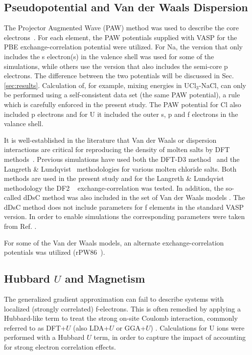 \documentclass[preprint,3p,10pt,twocolumn,number,sort&compress]{elsarticle}
\begin{document}
\subsection{Pseudopotential and Van der Waals Dispersion}

The Projector Augmented Wave (PAW) method was used to describe the core electrons~\cite{}. For each element, the PAW potentials supplied with VASP for the PBE exchange-correlation potential were utilized. For Na, the version that only includes the s electron(s) in the valence shell was used for some of the simulations, while others use the version that also includes the semi-core p electrons. The difference between the two potentials will be discussed in Sec. \ref{sec:results}. Calculation of, for example, mixing energies in UCl$_3$-NaCl, can only be performed using a self-consistent data set (the same PAW potential), a rule which is carefully enforced in the present study. The PAW potential for Cl also included p electrons and for U it included the outer s, p and f electrons in the valance shell. 

It is well-established in the literature that Van der Waals or dispersion interactions are critical for reproducing the density of molten salts by DFT methods~\cite{}. Previous simulations have used both the DFT-D3 method~\cite{} and the Langreth \& Lundqvist~\cite{dion2004} methodologies for various molten chloride salts. Both methods are used in the present study and for the Langreth \& Lundqvist methodology the DF2 ~\cite{klime2009} exchange-correlation was tested. In addition, the so-called dDsC method was also included in the set of Van der Waals models \cite{}. The dDsC method does not include parameters for f elements in the standard VASP version. In order to enable simulations the corresponding parameters were taken from Ref. \cite{}. 



For some of the Van der Waals models, an alternate exchange-correlation potentials was utilized (rPW86~\cite{}). 

\subsection{Hubbard $U$ and Magnetism}

The generalized gradient approximation can fail to describe systems with localized (strongly correlated) f-electrons. This is often remedied by applying a Hubbard-like term to treat the strong on-site Coulomb interaction, commonly referred to as DFT+$U$ (also LDA+$U$ or GGA+$U$) \cite{rohrbach2003}. Calculations for U ions were performed with a Hubbard $U$ term, in order to capture the impact of accounting for strong electron correlation effects. 
\end{document}
